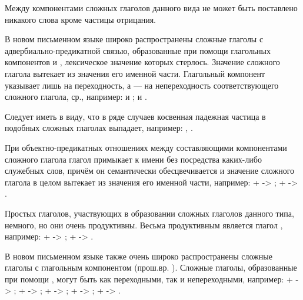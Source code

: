 Между компонентами сложных глаголов данного вида не может быть поставлено никакого слова кроме частицы отрицания.

В новом письменном языке широко распространены сложные глаголы с адвербиально-предикатной связью, образованные при помощи глагольных компонентов  и , лексическое значение которых стерлось. Значение сложного глагола вытекает из значения его именной части. Глагольный компонент  указывает лишь на переходность, а  --- на непереходность соответствующего сложного глагола, ср., например:
 и ;
 и .

Следует иметь в виду, что в ряде случаев косвенная падежная частица в подобных сложных глаголах выпадает, например:
,
.

При объектно-предикатных отношениях между составляющими компонентами сложного глагола глагол примыкает к имени без посредства каких-либо служебных слов, причём он семантически обесцвечивается и значение сложного глагола в целом вытекает из значения его именной части, например:
 +  -> ;
 +  -> .

Простых глаголов, участвующих в образовании сложных глаголов данного типа, немного, но они очень продуктивны. Весьма продуктивным является глагол , например:
 +  -> ;
 +  -> .

В новом письменном языке также очень широко распространены сложные глаголы с глагольным компонентом  (прош.вр. ). Сложные глаголы, образованные при помощи , могут быть как переходными, так и непереходными, например:
 +  -> ;
 +  -> ;
 +  -> ;
 +  -> ;
 +  -> .

